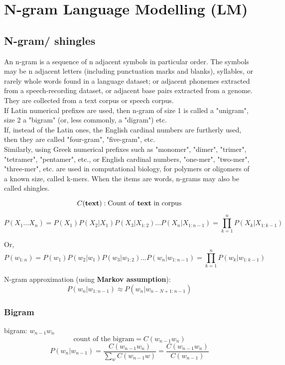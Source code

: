 \chapter{N-gram Language Modelling (LM)}

\section{N-gram/ shingles \cite{wiki-n-gram}}

An n-gram is a sequence of n adjacent symbols in particular order. The symbols may be n adjacent letters (including punctuation marks and blanks), syllables, or rarely whole words found in a language dataset; or adjacent phonemes extracted from a speech-recording dataset, or adjacent base pairs extracted from a genome. They are collected from a text corpus or speech corpus. \\
If Latin numerical prefixes are used, then n-gram of size 1 is called a "unigram", size 2 a "bigram" (or, less commonly, a "digram") etc. \\
If, instead of the Latin ones, the English cardinal numbers are furtherly used, then they are called "four-gram", "five-gram", etc. \\
Similarly, using Greek numerical prefixes such as "monomer", "dimer", "trimer", "tetramer", "pentamer", etc., or English cardinal numbers, "one-mer", "two-mer", "three-mer", etc. are used in computational biology, for polymers or oligomers of a known size, called k-mers. When the items are words, n-grams may also be called shingles.

\[
    C(\text{\textbf{text}}) : \text{Count of \textbf{text} in corpus}
\]

\[
    P(X_1...X_n) = P(X_1)P(X_2|X_1)P(X_3|X_{1:2})...P(X_n|X_{1:n-1}) = \prod_{k=1}^{n} P(X_k|X_{1:k-1}) 
\]

Or,
\[
    P(w_{1:n}) = P(w_1)P(w_2|w_1)P(w_3|w_{1:2})...P(w_n|w_{1:n-1}) = \prod_{k=1}^{n} P(w_k|w_{1:k-1}) 
\]

N-gram approximation (using \textbf{Markov assumption}):
\[
    P(w_n|w_{1:n-1}) \approx P(w_n|w_{n-N+1:n-1})
\]

\subsection{Bigram \cite{nlp-1}}
bigram: \(w_{n-1}w_n\)
\[
    \text{count of the bigram} = C(w_{n-1}w_n)
\]
\[
    P(w_n|w_{n-1}) = \displaystyle\dfrac{C(w_{n-1}w_n)}{\sum_w C(w_{n-1}w)} = \displaystyle\dfrac{C(w_{n-1}w_n)}{C(w_{n-1})} 
\]

